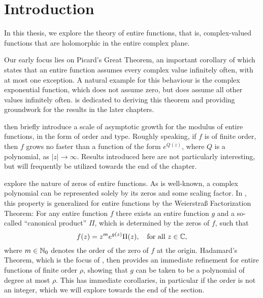 \chapter{Introduction}
\label{ch:introduction}

In this thesis, we explore the theory of entire functions, that is, complex-valued functions that are holomorphic in the entire complex plane.

Our early focus lies on Picard's Great Theorem, an important corollary of which states that an entire function assumes every complex value infinitely often, with at most one exception. A natural example for this behaviour is the complex exponential function, which does not assume zero, but does assume all other values infinitely often.  is dedicated to deriving this theorem and providing groundwork for the results in the later chapters.

 then briefly introduce a scale of asymptotic growth for the modulus of entire functions, in the form of order and type. Roughly speaking, if $f$ is of finite order, then $f$ grows no faster than a function of the form $e^{Q(z)}$, where $Q$ is a polynomial, as $\vert z \vert \to \infty$. Results introduced here are not particularly interesting, but will frequently be utilized towards the end of the chapter.

 explore the nature of zeros of entire functions. As is well-known, a complex polynomial can be represented solely by its zeros and some scaling factor. In , this property is generalized for entire functions by the Weierstraß Factorization Theorem: For any entire function $f$ there exists an entire function $g$ and a so-called ``canonical product'' $\Pi$, which is determined by the zeros of $f$, such that
$$ f(z) = z^m e^{g(z)} \Pi(z), \quad \textrm{for all } z \in \mathbb{C}, $$
where $m \in \mathbb{N}_0$ denotes the order of the zero of $f$ at the origin. Hadamard's Theorem, which is the focus of , then provides an immediate refinement for entire functions of finite order $\rho $, showing that $g$ can be taken to be a polynomial of degree at most $\rho$. This has immediate corollaries, in particular if the order is not an integer, which we will explore towards the end of the section.


